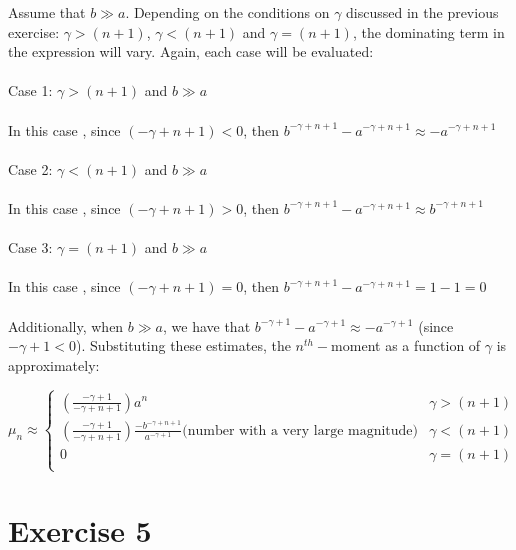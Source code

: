 \documentclass{article}
\begin{document}
Assume that $b \gg a$. Depending on the conditions on $\gamma$ discussed in the previous exercise: $\gamma > (n+1)$, $\gamma < (n+1)$ and $\gamma = (n+1)$, the dominating term in the expression will vary. Again, each case will be evaluated: \\
\\
Case 1: $\gamma > (n+1)$ and $b \gg a$ \\
\\
In this case , since $(-\gamma+n+1) < 0$, then $b^{-\gamma+n + 1} -a^{-\gamma+n+1} \approx -a^{-\gamma+n+1}$\\
\\
Case 2: $\gamma < (n+1)$ and $b \gg a$ \\
\\
In this case , since $(-\gamma+n+1) > 0$, then $b^{-\gamma+n + 1} -a^{-\gamma+n+1} \approx b^{-\gamma+n+1}$\\
\\
Case 3: $\gamma = (n+1)$ and $b \gg a$\\
\\
In this case , since $(-\gamma+n+1) = 0$, then $b^{-\gamma+n + 1} -a^{-\gamma+n+1} = 1 - 1 = 0$\\
\\
Additionally, when $b\gg a$, we have that $b^{-\gamma + 1} - a^{-\gamma+1} \approx - a^{-\gamma+1}$ (since $-\gamma + 1 < 0$). Substituting these estimates, the $n^{th}-$moment as a function of $\gamma$ is approximately:

\[ \mu_n \approx \begin{cases}
(\frac{-\gamma+1}{-\gamma+n+1}) a^n & \gamma > (n+1) \\
(\frac{-\gamma+1}{-\gamma+n+1}) \frac{-b^{-\gamma+n+1}}{a^{-\gamma+1}} \text{(number with a very large magnitude)} & \gamma < (n+1) \\
0 & \gamma = (n+1)\\
\end{cases}\]

\section{Exercise 5}
\end{document}
